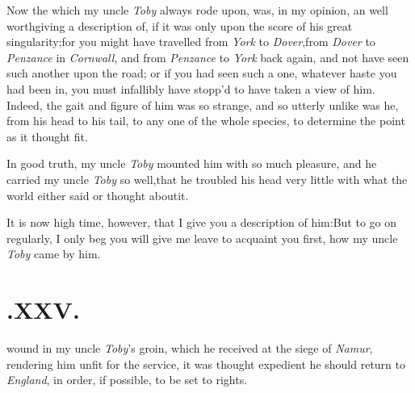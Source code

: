 \documentclass[twoside]{article}
\begin{document}
Now the  which my\break
uncle \textit{Toby} always rode upon, was, in my\break
opinion, an  well worth\break giving
a description of, if it was only upon the score of his great
singularity;\break for you might have travelled from \textit{York} to
\textit{Dover},\tsk from \textit{Dover} to \textit{Penzance} in
\textit{Cornwall}, and from \textit{Penzance} to \textit{York} back
again, and not have seen such another upon the road; or if you had seen
such a one, whatever haste you had been in, you must infallibly have
stopp’d to have taken a view of him. Indeed, the gait and figure of him
was so strange, and so utterly unlike was he, from his head to his tail,
to any one of the whole species, 
to determine the point as it thought fit.

In good truth, my uncle \textit{Toby} mounted him with so much
pleasure, and he carried my uncle \textit{Toby} so
well,\tsh that he troubled his head very little with what
the world either said or thought about\break it.

It is now high time, however, that I give you a description of
him:\tsk But to go on regularly, I only beg you will give me
leave to acquaint you first, how my uncle \textit{Toby} came by
him.

\section{\chapstrut{}.\enspace XXV.}

 wound in my uncle \textit{Toby}’s\break
groin, which he received at the\break
siege of \textit{Namur}, rendering him unfit for 
the service, it was thought expedient he
should return to \textit{England}, in order, if\break
possible, to be set to rights.
\end{document}

